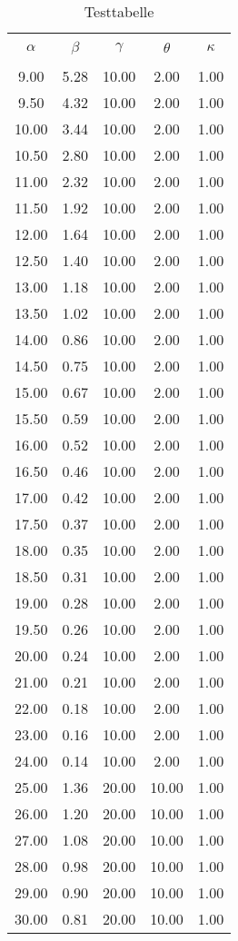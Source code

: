  
\begin{table} 
 \centering 
 \caption{Testtabelle} 
 \label{tab:some_data} 
 \begin{tabular}{S S S S S} 
 \toprule \\ 
 $\alpha$ & $\beta$ & $\gamma$ & $\theta$ & $\kappa$ \\ 
  \midrule \\ 
 9.00 & 5.28 & 10.00 & 2.00 & 1.00 \\ 
 9.50 & 4.32 & 10.00 & 2.00 & 1.00 \\ 
 10.00 & 3.44 & 10.00 & 2.00 & 1.00 \\ 
 10.50 & 2.80 & 10.00 & 2.00 & 1.00 \\ 
 11.00 & 2.32 & 10.00 & 2.00 & 1.00 \\ 
 11.50 & 1.92 & 10.00 & 2.00 & 1.00 \\ 
 12.00 & 1.64 & 10.00 & 2.00 & 1.00 \\ 
 12.50 & 1.40 & 10.00 & 2.00 & 1.00 \\ 
 13.00 & 1.18 & 10.00 & 2.00 & 1.00 \\ 
 13.50 & 1.02 & 10.00 & 2.00 & 1.00 \\ 
 14.00 & 0.86 & 10.00 & 2.00 & 1.00 \\ 
 14.50 & 0.75 & 10.00 & 2.00 & 1.00 \\ 
 15.00 & 0.67 & 10.00 & 2.00 & 1.00 \\ 
 15.50 & 0.59 & 10.00 & 2.00 & 1.00 \\ 
 16.00 & 0.52 & 10.00 & 2.00 & 1.00 \\ 
 16.50 & 0.46 & 10.00 & 2.00 & 1.00 \\ 
 17.00 & 0.42 & 10.00 & 2.00 & 1.00 \\ 
 17.50 & 0.37 & 10.00 & 2.00 & 1.00 \\ 
 18.00 & 0.35 & 10.00 & 2.00 & 1.00 \\ 
 18.50 & 0.31 & 10.00 & 2.00 & 1.00 \\ 
 19.00 & 0.28 & 10.00 & 2.00 & 1.00 \\ 
 19.50 & 0.26 & 10.00 & 2.00 & 1.00 \\ 
 20.00 & 0.24 & 10.00 & 2.00 & 1.00 \\ 
 21.00 & 0.21 & 10.00 & 2.00 & 1.00 \\ 
 22.00 & 0.18 & 10.00 & 2.00 & 1.00 \\ 
 23.00 & 0.16 & 10.00 & 2.00 & 1.00 \\ 
 24.00 & 0.14 & 10.00 & 2.00 & 1.00 \\ 
 25.00 & 1.36 & 20.00 & 10.00 & 1.00 \\ 
 26.00 & 1.20 & 20.00 & 10.00 & 1.00 \\ 
 27.00 & 1.08 & 20.00 & 10.00 & 1.00 \\ 
 28.00 & 0.98 & 20.00 & 10.00 & 1.00 \\ 
 29.00 & 0.90 & 20.00 & 10.00 & 1.00 \\ 
 30.00 & 0.81 & 20.00 & 10.00 & 1.00 \\ 
 \bottomrule 
 \end{tabular} 
 \end{table} 
 